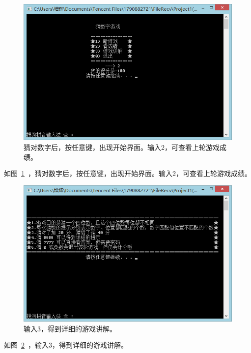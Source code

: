 \begin{figure}[htp]
\includegraphics[width=\textwidth]{image/31.png}
\caption{\label{p11}猜对数字后，按任意键，出现开始界面。输入2，可查看上轮游戏成绩。}
\end{figure}
 
如图~\ref{p11}~，猜对数字后，按任意键，出现开始界面。输入2，可查看上轮游戏成绩。

\begin{figure}[htp]
\includegraphics[width=\textwidth]{image/32.png}
\caption{\label{p12}输入3，得到详细的游戏讲解。}
\end{figure}
 
如图~\ref{p12}~，输入3，得到详细的游戏讲解。
